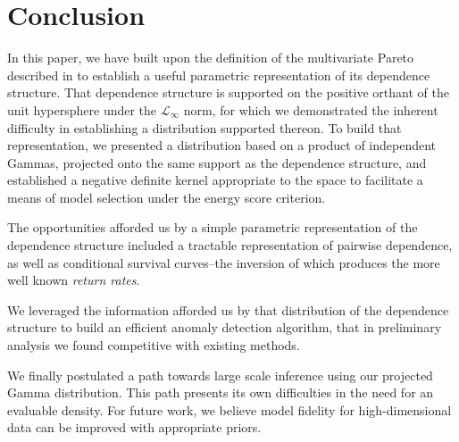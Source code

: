 
\section{Conclusion}
In this paper, we have built upon the definition of the multivariate Pareto described in \cite{ferreira2014}
  to establish a useful parametric representation of its dependence structure.  That dependence structure
  is supported on the positive orthant of the unit hypersphere under the $\mathcal{L}_{\infty}$ norm,
  for which we demonstrated the inherent difficulty in establishing a distribution supported thereon.
  To build that representation, we presented a distribution based on a product of independent Gammas,
  projected onto the same support as the dependence structure, and established a negative definite kernel
  appropriate to the space to facilitate a means of model selection under the energy score criterion.

The opportunities afforded us by a simple parametric representation of the dependence structure included
  a tractable representation of pairwise dependence, as well as conditional survival curves--the
  inversion of which produces the more well known \emph{return rates}.

We leveraged the information afforded us by that distribution of the dependence structure to build
  an efficient anomaly detection algorithm, that in preliminary analysis we found competitive with
  existing methods.

We finally postulated a path towards large scale inference using our projected Gamma distribution.
  This path presents its own difficulties in the need for an evaluable density.  For future work, we
  believe model fidelity for high-dimensional data can be improved with appropriate priors.





